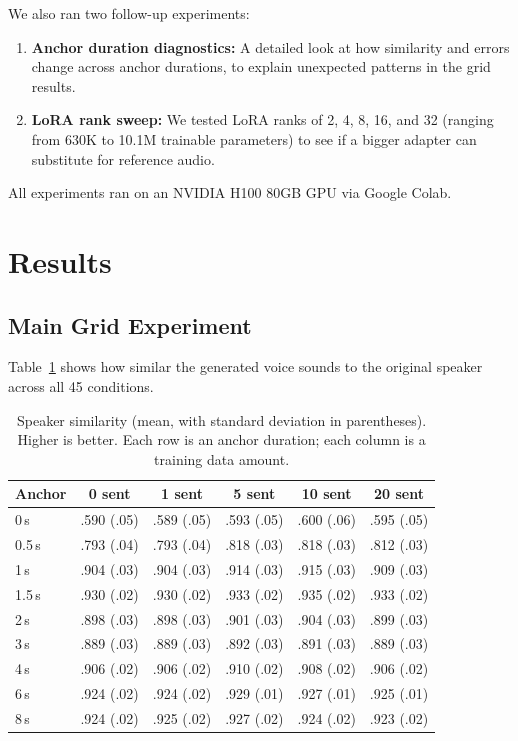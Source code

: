 \documentclass[11pt, a4paper]{article}
\begin{document}
We also ran two follow-up experiments:
\begin{enumerate}[itemsep=2pt]
    \item \textbf{Anchor duration diagnostics:} A detailed look at how similarity and errors change across anchor durations, to explain unexpected patterns in the grid results.
    \item \textbf{LoRA rank sweep:} We tested LoRA ranks of 2, 4, 8, 16, and 32 (ranging from 630K to 10.1M trainable parameters) to see if a bigger adapter can substitute for reference audio.
\end{enumerate}

All experiments ran on an NVIDIA H100 80GB GPU via Google Colab.

\section{Results}

\subsection{Main Grid Experiment}

Table~\ref{tab:sim_grid} shows how similar the generated voice sounds to the original speaker across all 45 conditions.

\begin{table}[H]
\centering
\caption{Speaker similarity (mean, with standard deviation in parentheses). Higher is better. Each row is an anchor duration; each column is a training data amount.}
\label{tab:sim_grid}
\small
\begin{tabular}{@{}l ccccc@{}}
\toprule
\textbf{Anchor} & \textbf{0 sent} & \textbf{1 sent} & \textbf{5 sent} & \textbf{10 sent} & \textbf{20 sent} \\
\midrule
0\,s   & .590 (.05) & .589 (.05) & .593 (.05) & .600 (.06) & .595 (.05) \\
0.5\,s & .793 (.04) & .793 (.04) & .818 (.03) & .818 (.03) & .812 (.03) \\
1\,s   & .904 (.03) & .904 (.03) & .914 (.03) & .915 (.03) & .909 (.03) \\
1.5\,s & .930 (.02) & .930 (.02) & .933 (.02) & .935 (.02) & .933 (.02) \\
2\,s   & .898 (.03) & .898 (.03) & .901 (.03) & .904 (.03) & .899 (.03) \\
3\,s   & .889 (.03) & .889 (.03) & .892 (.03) & .891 (.03) & .889 (.03) \\
4\,s   & .906 (.02) & .906 (.02) & .910 (.02) & .908 (.02) & .906 (.02) \\
6\,s   & .924 (.02) & .924 (.02) & .929 (.01) & .927 (.01) & .925 (.01) \\
8\,s   & .924 (.02) & .925 (.02) & .927 (.02) & .924 (.02) & .923 (.02) \\
\bottomrule
\end{tabular}
\end{table}
\end{document}
